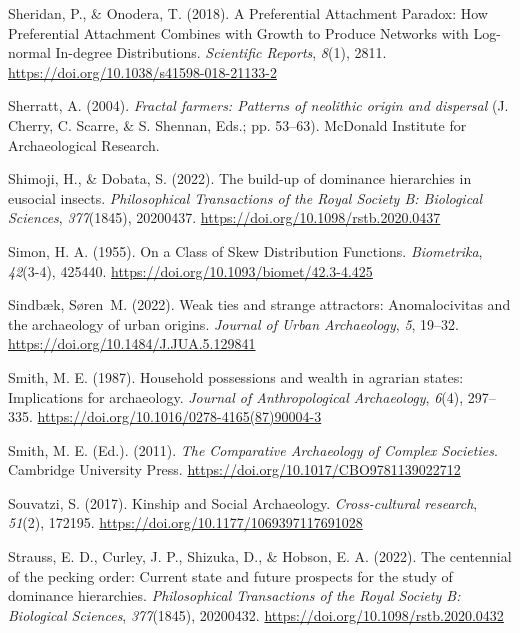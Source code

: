 \documentclass[
  12pt,
]{book}
\newlength{\cslhangindent}
\newlength{\cslentryspacingunit} %
\newenvironment{CSLReferences}[2] %
 {%
  \setlength{\parindent}{0pt}
  \ifodd #1
  \let\oldpar\par
  \def\par{\hangindent=\cslhangindent\oldpar}
  \fi
  \setlength{\parskip}{#2\cslentryspacingunit}
 }%
 {}
\begin{document}
\begin{CSLReferences}{1}{0}
\leavevmode{}%
Sheridan, P., \& Onodera, T. (2018). A Preferential Attachment Paradox: How Preferential Attachment Combines with Growth to Produce Networks with Log-normal In-degree Distributions. \emph{Scientific Reports}, \emph{8}(1), 2811. \url{https://doi.org/10.1038/s41598-018-21133-2}

\leavevmode{}%
Sherratt, A. (2004). \emph{Fractal farmers: Patterns of neolithic origin and dispersal} (J. Cherry, C. Scarre, \& S. Shennan, Eds.; pp. 53--63). McDonald Institute for Archaeological Research.

\leavevmode{}%
Shimoji, H., \& Dobata, S. (2022). The build-up of dominance hierarchies in eusocial insects. \emph{Philosophical Transactions of the Royal Society B: Biological Sciences}, \emph{377}(1845), 20200437. \url{https://doi.org/10.1098/rstb.2020.0437}

\leavevmode{}%
Simon, H. A. (1955). On a Class of Skew Distribution Functions. \emph{Biometrika}, \emph{42}(3-4), 425440. \url{https://doi.org/10.1093/biomet/42.3-4.425}

\leavevmode{}%
Sindbæk, Søren~M. (2022). Weak ties and strange attractors: Anomalocivitas and the archaeology of urban origins. \emph{Journal of Urban Archaeology}, \emph{5}, 19--32. \url{https://doi.org/10.1484/J.JUA.5.129841}

\leavevmode{}%
Smith, M. E. (1987). Household possessions and wealth in agrarian states: Implications for archaeology. \emph{Journal of Anthropological Archaeology}, \emph{6}(4), 297--335. \url{https://doi.org/10.1016/0278-4165(87)90004-3}

\leavevmode{}%
Smith, M. E. (Ed.). (2011). \emph{The Comparative Archaeology of Complex Societies}. Cambridge University Press. \url{https://doi.org/10.1017/CBO9781139022712}

\leavevmode{}%
Souvatzi, S. (2017). Kinship and Social Archaeology. \emph{Cross-cultural research}, \emph{51}(2), 172195. \url{https://doi.org/10.1177/1069397117691028}

\leavevmode{}%
Strauss, E. D., Curley, J. P., Shizuka, D., \& Hobson, E. A. (2022). The centennial of the pecking order: Current state and future prospects for the study of dominance hierarchies. \emph{Philosophical Transactions of the Royal Society B: Biological Sciences}, \emph{377}(1845), 20200432. \url{https://doi.org/10.1098/rstb.2020.0432}


\end{CSLReferences}
\end{document}
